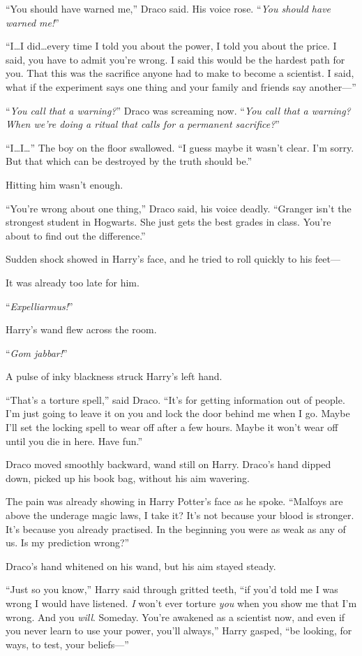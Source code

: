 “You should have warned me,” Draco said. His voice rose. “\emph{You should have warned me!}”

“I…I did…every time I told you about the power, I told you about the price. I said, you have to admit you’re wrong. I said this would be the hardest path for you. That this was the sacrifice anyone had to make to become a scientist. I said, what if the experiment says one thing and your family and friends say another—”

“\emph{You call that a warning?}” Draco was screaming now. “\emph{You call that a warning? When we’re doing a ritual that calls for a permanent sacrifice?}”

“I…I…” The boy on the floor swallowed. “I guess maybe it wasn’t clear. I’m sorry. But that which can be destroyed by the truth should be.”

Hitting him wasn’t enough.

“You’re wrong about one thing,” Draco said, his voice deadly. “Granger isn’t the strongest student in Hogwarts. She just gets the best grades in class. You’re about to find out the difference.”

Sudden shock showed in Harry’s face, and he tried to roll quickly to his feet—

It was already too late for him.

“\emph{Expelliarmus!}”

Harry’s wand flew across the room.

“\emph{Gom jabbar!}”

A pulse of inky blackness struck Harry’s left hand.

“That’s a torture spell,” said Draco. “It’s for getting information out of people. I’m just going to leave it on you and lock the door behind me when I go. Maybe I’ll set the locking spell to wear off after a few hours. Maybe it won’t wear off until you die in here. Have fun.”

Draco moved smoothly backward, wand still on Harry. Draco’s hand dipped down, picked up his book bag, without his aim wavering.

The pain was already showing in Harry Potter’s face as he spoke. “Malfoys are above the underage magic laws, I take it? It’s not because your blood is stronger. It’s because you already practised. In the beginning you were as weak as any of us. Is my prediction wrong?”

Draco’s hand whitened on his wand, but his aim stayed steady.

“Just so you know,” Harry said through gritted teeth, “if you’d told me I was wrong I would have listened. \emph{I} won’t ever torture \emph{you} when you show me that I’m wrong. And you \emph{will}. Someday. You’re awakened as a scientist now, and even if you never learn to use your power, you’ll always,” Harry gasped, “be looking, for ways, to test, your beliefs—”

